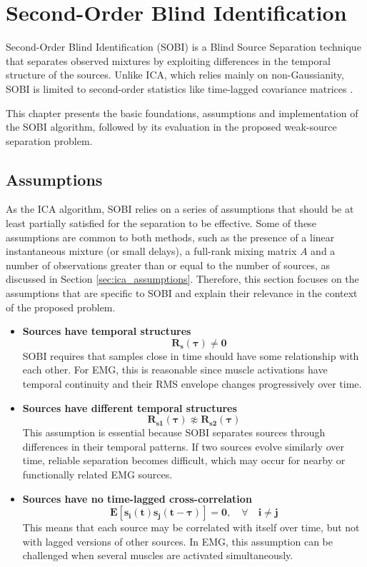\chapter{Second-Order Blind Identification}
\label{ch:sobi}

Second-Order Blind Identification (SOBI) is a Blind Source Separation technique that separates observed mixtures by exploiting differences in the temporal structure of the sources. Unlike ICA, which relies mainly on non-Gaussianity, SOBI is limited to second-order statistics like time-lagged covariance matrices \cite{pan_review_2022}.

This chapter presents the basic foundations, assumptions and implementation of the SOBI algorithm, followed by its evaluation in the proposed weak-source separation problem.


\section{Assumptions}
\label{sec:sobi_assumptions}
As the ICA algorithm, SOBI relies on a series of assumptions that should be at least partially satisfied for the separation to be effective. Some of these assumptions are common to both methods, such as the presence of a linear instantaneous mixture (or small delays), a full-rank mixing matrix $A$ and a number of observations greater than or equal to the number of sources, as discussed in Section \ref{sec:ica_assumptions}. Therefore, this section focuses on the assumptions that are specific to SOBI and explain their relevance in the context of the proposed problem.



\begin{itemize}

    \item \textbf{Sources have temporal structures} 
    \[ 
        \mathbf{\quad R_s(\tau)\neq0}
    \]
    SOBI requires that samples close in time should have some relationship with each other. For EMG, this is reasonable since muscle activations have temporal continuity and their RMS envelope changes progressively over time.
    \item \textbf{Sources have different temporal structures}
    \[
        \mathbf{ R_{s1}(\tau)\not\approx R_{s2}(\tau)}
     \]
    This assumption is essential because SOBI separates sources through differences in their temporal patterns. If two sources evolve similarly over time, reliable separation becomes difficult, which may occur for nearby or functionally related EMG sources.
    \item \textbf{Sources have no time-lagged cross-correlation}
    \[
    \mathbf{E\left[s_i(t)s_j(t-\tau)\right] = 0, \quad \forall \quad i\neq j}
    \]
    This means that each source may be correlated with itself over time, but not with lagged versions of other sources. In EMG, this assumption can be challenged when several muscles are activated simultaneously.
\end{itemize}

